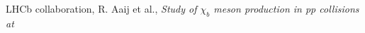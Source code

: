 \documentclass[a4paper]{article}
\begin{document}
\begin{thebibliography}{99}


 LHCb collaboration, R. Aaij et al., \textit{Study of $\chi_{b}$ meson production in pp collisions at
}
\end{thebibliography}
\end{document}
